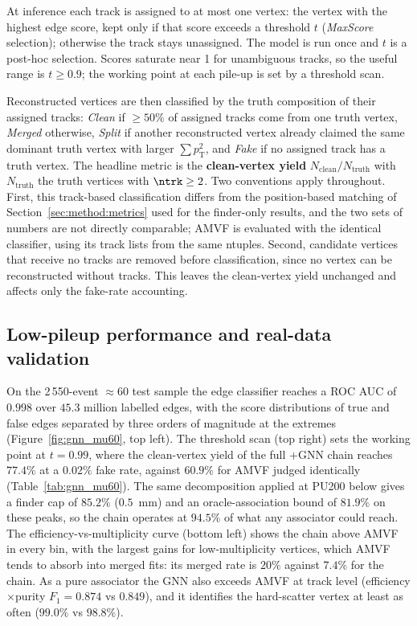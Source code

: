 At inference each track is assigned to at most one vertex: the vertex with the
highest edge score, kept only if that score exceeds a threshold $t$
(\emph{MaxScore} selection); otherwise the track stays unassigned. The model
is run once and $t$ is a post-hoc selection. Scores saturate near 1 for
unambiguous tracks, so the useful range is $t\geq0.9$; the working point at
each pile-up is set by a threshold scan.

Reconstructed vertices are then classified by the truth composition of their
assigned tracks: \emph{Clean} if $\geq50\%$ of assigned tracks come from one
truth vertex, \emph{Merged} otherwise, \emph{Split} if another reconstructed
vertex already claimed the same dominant truth vertex with larger
$\sum p_{\mathrm{T}}^{2}$, and \emph{Fake} if no assigned track has a truth
vertex. The headline metric is the \textbf{clean-vertex yield}
$N_{\text{clean}}/N_{\text{truth}}$ with $N_{\text{truth}}$ the truth vertices
with $\ntrk\geq2$. Two conventions apply throughout. First, this track-based
classification differs from the position-based matching of
Section~\ref{sec:method:metrics} used for the finder-only results, and the
two sets of numbers are not directly comparable; AMVF is evaluated with the
identical classifier, using its track lists from the same ntuples. Second,
candidate vertices that receive no tracks are removed before classification,
since no vertex can be reconstructed without tracks. This leaves the
clean-vertex yield unchanged and affects only the fake-rate accounting.

\subsection{Low-pileup performance and real-data validation}
\label{sec:gnn:mu60}

On the 2\,550-event \muavg{}$\approx$60 test sample the edge classifier
reaches a ROC AUC of $0.998$ over $45.3$ million labelled edges, with the
score distributions of true and false edges separated by three orders of
magnitude at the extremes (Figure~\ref{fig:gnn_mu60}, top left). The
threshold scan (top right) sets the working point at $t=0.99$, where the
clean-vertex yield of the full \pvf{}+GNN chain reaches $\mathbf{77.4\%}$ at
a $0.02\%$ fake rate, against $\mathbf{60.9\%}$ for AMVF judged identically
(Table~\ref{tab:gnn_mu60}). The same decomposition applied at PU200 below
gives a finder cap of $85.2\%$ ($0.5$~mm) and an oracle-association bound of
$81.9\%$ on these peaks, so the chain operates at $94.5\%$ of what any
associator could reach. The efficiency-vs-multiplicity curve (bottom left)
shows the chain above AMVF in every \ntrk{} bin, with the largest gains for
low-multiplicity vertices, which AMVF tends to absorb into merged fits: its
merged rate is $20\%$ against $7.4\%$ for the chain. As a pure associator
the GNN also exceeds AMVF at track level (efficiency$\times$purity
$F_1 = 0.874$ vs $0.849$), and it identifies the hard-scatter vertex at
least as often ($99.0\%$ vs $98.8\%$).

